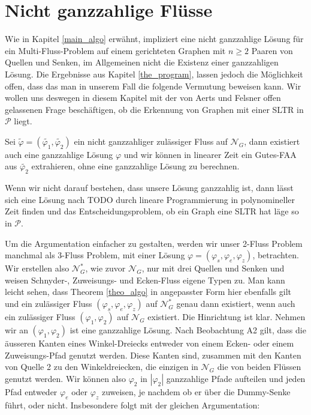\chapter{Nicht ganzzahlige Flüsse}

Wie in Kapitel \ref{main_algo} erwähnt, impliziert eine nicht ganzzahlige Lösung für ein Multi-Fluss-Problem auf einem gerichteten Graphen mit $n\geq 2$ Paaren von Quellen und Senken, im Allgemeinen nicht die Existenz einer ganzzahligen Lösung. Die Ergebnisse aus Kapitel \ref{the_program}, lassen jedoch die Möglichkeit offen, dass das man in unserem Fall die folgende Vermutung beweisen kann. Wir wollen uns deswegen in diesem Kapitel mit der von Aerts und Felsner offen gelassenen Frage beschäftigen, ob die Erkennung von Graphen mit einer SLTR in $\mathcal{P}$ liegt.

\begin{conjecture}\label{int_conj}
Sei $\tilde{\varphi}=(\tilde{\varphi_1},\tilde{\varphi_2})$ ein nicht ganzzahliger zulässiger Fluss auf $\mathcal{N}_G$, dann existiert auch eine ganzzahlige Lösung $\varphi$ und wir können in linearer Zeit ein Gutes-FAA aus $\tilde{\varphi_2}$ extrahieren, ohne eine ganzzahlige Lösung zu berechnen.
\end{conjecture}

\begin{remark}
Wenn wir nicht darauf bestehen, dass unsere Lösung ganzzahlig ist, dann lässt sich eine Lösung nach TODO durch lineare Programmierung in polynomineller Zeit finden und das Entscheidungsproblem, ob ein Graph eine SLTR hat läge so in $\mathcal{P}$.
\end{remark}

Um die Argumentation einfacher zu gestalten, werden wir unser 2-Fluss Problem manchmal als 3-Fluss Problem, mit einer Lösung $\varphi=(\varphi_s,\varphi_e,\varphi_z)$, betrachten. Wir erstellen also $\mathcal{N}_G^*$, wie zuvor $\mathcal{N}_G$, nur mit drei Quellen und Senken und weisen Schnyder-, Zuweisungs- und Ecken-Fluss eigene Typen zu. Man kann leicht sehen, dass Theorem \ref{theo_algo} in angepasster Form hier ebenfalls gilt und ein zulässiger  Fluss $(\varphi_s,\varphi_e,\varphi_z)$ auf $\mathcal{N}_G^*$ genau dann existiert, wenn auch ein zulässiger Fluss $(\varphi_1,\varphi_2)$ auf $\mathcal{N}_G$ existiert. Die Hinrichtung ist klar. Nehmen wir an $(\varphi_1,\varphi_2)$ ist eine ganzzahlige Lösung. Nach Beobachtung A2 gilt, dass die äusseren Kanten eines Winkel-Dreiecks entweder von einem Ecken- oder einem Zuweisungs-Pfad genutzt werden. Diese Kanten sind, zusammen mit den Kanten von Quelle 2 zu den Winkeldreiecken, die einzigen in $\mathcal{N}_G$ die von beiden Flüssen genutzt werden. Wir können also $\varphi_2$ in $|\varphi_2|$ ganzzahlige Pfade aufteilen und jeden Pfad entweder $\varphi_e$ oder $\varphi_z$ zuweisen, je nachdem ob er über die Dummy-Senke führt, oder nicht. Insbesondere folgt mit der gleichen Argumentation:  

